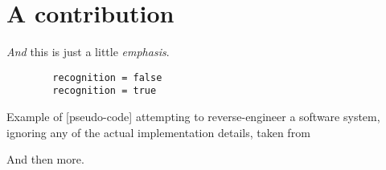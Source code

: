 

\section{A contribution}

\emph{And} this is just a little \emph{emphasis}.

\begin{listing}
    \begin{verbatim}
        recognition = false
        recognition = true
    \end{verbatim}
    \caption[Short version]{Example of [pseudo-code] attempting to reverse-engineer a software system, ignoring any of the actual implementation details, taken from \citep{nielsen_working_2017}}
    \label{code:nielsen_chalktalk}
\end{listing}

And then more.

